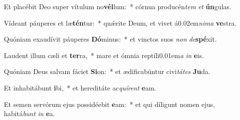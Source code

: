 \item Et placébit Deo super vítulum no\textbf{vél}lum:~* córnua producén\textit{tem} \textit{et} \textbf{ún}gulas.
\item Vídeant páuperes et læ\textbf{tén}tur:~* quǽrite Deum, et vivet á\kern 0.02em\textit{nima} \textbf{ve}stra.
\item Quóniam exaudívit páuperes \textbf{Dó}minus:~* et vinctos suos \textit{non} \textit{de}\textbf{spé}xit.
\item Laudent illum cæli et \textbf{ter}ra,~* mare et ómnia reptíli\kern 0.01em\textit{a} \textit{in} \textbf{e}is.
\item Quóniam Deus salvam fáciet \textbf{Si}on:~* et ædificabúntur civi\textit{tátes} \textbf{Ju}da.
\item Et inhabitábunt \textbf{i}bi,~* et hereditáte ac\textit{quírent} \textbf{e}am.
\item Et semen servórum ejus possidéebit \textbf{e}am:~* et qui díligunt nomen ejus, habitá\textit{bunt} \textit{in} \textbf{e}a.
